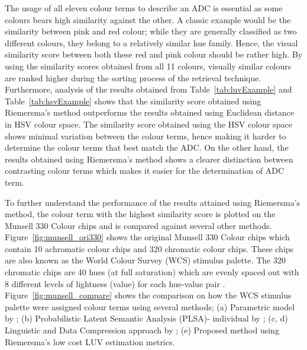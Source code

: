 The usage of all eleven colour terms to describe an ADC is essential as some colours bears high similarity against the other. A classic example would be the similarity between pink and red colour; while they are generally classified as two different colours, they belong to a relatively similar hue family. Hence, the visual similarity score between both these red and pink colour should be rather high. By using the similarity scores obtained from all 11 colours, visually similar colours are ranked higher during the sorting process of the retrieval technique.
Furthermore, analysis of the results obtained from Table~\ref{tab:luvExample} and Table~\ref{tab:hsvExample} shows that the similarity score obtained using Riemersma's method outperforms the results obtained using Euclidean distance in HSV colour space.
The similarity score obtained using the HSV colour space shows minimal variation between the colour terms, hence making it harder to determine the colour terms that best match the ADC.
On the other hand, the results obtained using Riemersma's method shows a clearer distinction between contrasting colour terms which makes it easier for the determination of ADC term.

To further understand the performance of the results attained using Riemersma's method, the colour term with the highest similarity score is plotted on the Munsell 330 Colour chips and is compared against several other methods.
Figure~\ref{fig:munsell_ori330} shows the original Munsell 330 Colour chips which contain 10 achromatic colour chips and 320 chromatic colour chips.
These chips are also known as the World Colour Survey (WCS) stimulus palette.
The 320 chromatic chips are 40 hues (at full saturation) which are evenly spaced out with 8 different levels of lightness (value) for each hue-value pair \cite{kay2009world}.
Figure~\ref{fig:munsell_compare} shows the comparison on how the WCS stimulus palette were assigned colour terms using several methods; (a) Parametric model by ; (b) Probabilistic Latent Semantic Analysis (PLSA)- individual by ; (c, d) Linguistic and Data Compression approach by ; (e) Proposed method using Riemersma's low cost LUV estimation metrics.

